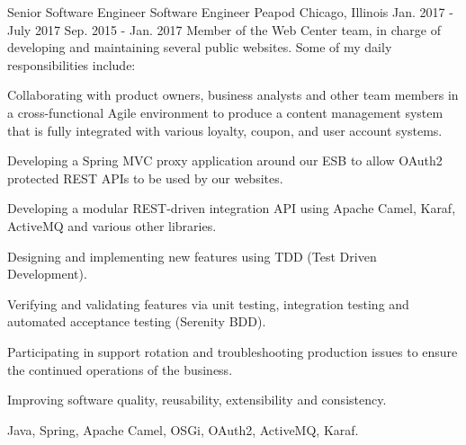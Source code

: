 \begin{cventries}
  \cventryfour
    {Senior Software Engineer} %
    {Software Engineer} %
    {Peapod} %
    {Chicago, Illinois} %
    {Jan. 2017 - July 2017} %
    {Sep. 2015 - Jan. 2017} %
    {Member of the Web Center team, in charge of developing and maintaining several public websites. Some of my daily responsibilities include:
    } %
    {
    	\begin{cvitems}
  		\item Collaborating with product owners, business analysts and other team members in a cross-functional Agile environment to produce a content management system that is fully integrated with various loyalty, coupon, and user account systems.
  		\item Developing a Spring MVC proxy application around our ESB to allow OAuth2 protected REST APIs to be used by our websites.
  		\item Developing a modular REST-driven integration API using Apache Camel, Karaf, ActiveMQ and various other libraries.
  		\item Designing and implementing new features using TDD (Test Driven Development).
  		\item Verifying and validating features via unit testing, integration testing and automated acceptance testing (Serenity BDD).
  		\item Participating in support rotation and troubleshooting production issues to ensure the continued operations of the business.
  		\item Improving software quality, reusability, extensibility and consistency.
	\end{cvitems} 
    }
    {Java, Spring, Apache Camel, OSGi, OAuth2, ActiveMQ, Karaf.}
    
  

\end{cventries}
